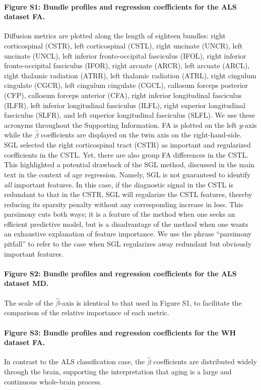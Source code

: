 \documentclass[10pt,letterpaper]{article}
\begin{document}
\paragraph{Figure S1: Bundle profiles and regression coefficients for the ALS dataset FA.}
Diffusion metrics are plotted
along the length of eighteen bundles:
right corticospinal (CSTR),
left corticospinal (CSTL),
right uncinate (UNCR),
left uncinate (UNCL),
left inferior fronto-occipital fasciculus (IFOL),
right inferior fronto-occipital fasciculus (IFOR),
right arcuate (ARCR),
left arcuate (ARCL),
right thalamic radiation (ATRR),
left thalamic radiation (ATRL),
right cingulum cingulate (CGCR),
left cingulum cingulate (CGCL),
callosum forceps posterior (CFP),
callosum forceps anterior (CFA),
right inferior longitudinal fasciculus (ILFR),
left inferior longitudinal fasciculus (ILFL),
right superior longitudinal fasciculus (SLFR),
and left superior longitudinal fasciculus (SLFL). We use these acronyms throughout the Supporting Information.
FA is plotted on the left $y$-axis while the $\hat{\beta}$ coefficients are displayed on the twin axis on the right-hand-side. SGL selected
the right corticospinal tract (CSTR) as important and regularized coefficients
in the CSTL. Yet, there are also group FA differences in the
CSTL. This highlighted a potential drawback of the SGL method, discussed in the
main text in the context of age regression. Namely, SGL is not guaranteed to
identify \emph{all} important features. In this case, if the diagnostic signal
in the CSTL is redundant to that in the CSTR, SGL will regularize the CSTL
features, thereby reducing its sparsity penalty without any corresponding
increase in loss. This parsimony cuts both ways; it is a feature of the method
when one seeks an efficient predictive model, but is a disadvantage of the
method when one wants an exhaustive explanation of feature importance. We use the phrase ``parsimony pitfall'' to refer to the case when SGL regularizes
away redundant but obviously important features.

\paragraph*{Figure S2: Bundle profiles and regression coefficients for the ALS dataset MD.} The scale of the $\hat{\beta}$-axis is identical to that used in Figure S1, to facilitate the comparison of the relative importance of each metric.

\paragraph*{Figure S3: Bundle profiles and regression
coefficients for the WH dataset FA.} In contrast to the ALS classification case,
the $\hat{\beta}$ coefficients are distributed widely through the brain, supporting the interpretation that aging is a large and continuous whole-brain process.
\end{document}
